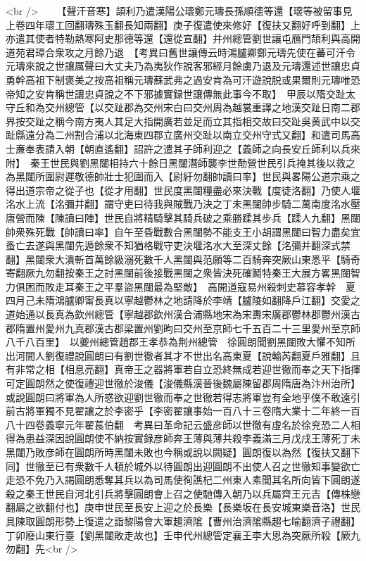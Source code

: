 <br />
　　【聲汗音寒】頡利乃遣漢陽公瓌鄭元璹長孫順德等還【瓌等被留事見上卷四年瓌工回翻璹殊玉翻長知兩翻】庚子復遣使來修好【復扶又翻好呼到翻】上亦遣其使者特勒熱寒阿史那德等還【還從宣翻】并州總管劉世讓屯鴈門頡利與高開道苑君璋合衆攻之月餘乃退　【考異曰舊世讓傳云時鴻臚卿鄭元璹先使在蕃可汗令元璹來說之世讓厲聲曰大丈夫乃為夷狄作說客邪經月餘虜乃退及元璹還述世讓忠貞勇幹高祖下制褒美之按高祖稱元璹蘇武弗之過安肯為可汗遊說脱或果爾則元璹唯恐帝知之安肯稱世讓忠貞說之不下邪據實録世讓傳無此事今不取】　甲辰以隋交趾太守丘和為交州總管【以交趾郡為交州宋白曰交州周為越裳重譯之地漢交趾日南二郡界按交趾之稱今南方夷人其足大指開廣若並足而立其指相交故曰交趾吳黄武中以交趾縣遠分為二州割合浦以北海東四郡立廣州交趾以南立交州守式又翻】和遣司馬高士亷奉表請入朝【朝直遙翻】詔許之遣其子師利迎之【義師之向長安丘師利以兵來附】　秦王世民與劉黑闥相持六十餘日黑闥潛師襲李世勣營世民引兵掩其後以救之為黑闥所圍尉遲敬德帥壯士犯圍而入【尉紆勿翻帥讀曰率】世民與畧陽公道宗乘之得出道宗帝之從子也【從才用翻】世民度黑闥糧盡必來決戰【度徒洛翻】乃使人堰洺水上流【洺彌并翻】謂守吏曰待我與賊戰乃決之丁未黑闥帥步騎二萬南度洺水壓唐營而陳【陳讀曰陣】世民自將精騎擊其騎兵破之乘勝蹂其步兵【蹂人九翻】黑闥帥衆殊死戰【帥讀曰率】自午至昏戰數合黑闥勢不能支王小胡謂黑闥曰智力盡矣宜蚤亡去遂與黑闥先遁餘衆不知猶格戰守吏決堰洺水大至深丈餘【洺彌并翻深式禁翻】黑闥衆大潰斬首萬餘級溺死數千人黑闥與范願等二百騎奔突厥山東悉平【騎奇寄翻厥九勿翻按秦王之討黑闥前後接戰黑闥之衆皆決死確鬭特秦王大展方畧黑闥智力俱困而敗走耳秦王之平羣盜黑闥最為堅敵】　高開道寇易州殺刺史慕容孝幹　夏四月己未隋鴻臚卿甯長真以寧越鬱林之地請降於李靖【臚陵如翻降戶江翻】交愛之道始通以長真為欽州總管【寧越郡欽州漢合浦縣地宋為宋夀宋廣郡鬱林郡鬱州漢古郡隋置州愛州九真郡漢古郡梁置州劉昫曰交州至京師七千五百二十三里愛州至京師八千八百里】　以夔州總管趙郡王孝恭為荆州總管　徐圓朗聞劉黑闥敗大懼不知所出河間人劉復禮說圓朗曰有劉世徹者其才不世出名高東夏【說輸芮翻夏戶雅翻】且有非常之相【相息亮翻】真帝王之器將軍若自立恐終無成若迎世徹而奉之天下指揮可定圓朗然之使復禮迎世徹於浚儀【浚儀縣漢晉後魏屬陳留郡周隋唐為汴州治所】或說圓朗曰將軍為人所惑欲迎劉世徹而奉之世徹若得志將軍豈有全地乎僕不敢遠引前古將軍獨不見翟讓之於李密乎【李密翟讓事始一百八十三卷隋大業十二年終一百八十四卷義寧元年翟萇伯翻　考異曰革命記云盛彦師以世徹有虛名於徐兖恐二人相得為患益深因說圓朗使不納按實録彦師奔王薄與薄共殺李義滿三月戊戌王薄死丁未黑闥乃敗彦師在圓朗所時黑闥未敗也今稱或說以闕疑】圓朗復以為然【復扶又翻下同】世徹至已有衆數千人頓於城外以待圓朗出迎圓朗不出使人召之世徹知事變欲亡走恐不免乃入謁圓朗悉奪其兵以為司馬使徇譙杞二州東人素聞其名所向皆下圓朗遂殺之秦王世民自河北引兵將擊圓朗會上召之使馳傳入朝乃以兵屬齊王元吉【傳株戀翻屬之欲翻付也】庚申世民至長安上迎之於長樂【長樂坂在長安城東樂音洛】世民具陳取圓朗形勢上復遣之詣黎陽會大軍趨濟隂【曹州治濟隂縣趨七喻翻濟子禮翻】　丁卯廢山東行臺【劉黑闥敗走故也】壬申代州總管定襄王李大恩為突厥所殺【厥九勿翻】先<br />
